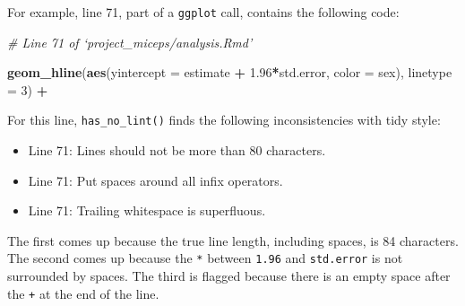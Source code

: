 \documentclass[12pt,twoside]{reedthesis}
\newenvironment{Shaded}{\begin{snugshade}}{\end{snugshade}}
\newcommand{\KeywordTok}[1]{\textcolor[rgb]{0.13,0.29,0.53}{\textbf{#1}}}
\newcommand{\DataTypeTok}[1]{\textcolor[rgb]{0.13,0.29,0.53}{#1}}
\newcommand{\DecValTok}[1]{\textcolor[rgb]{0.00,0.00,0.81}{#1}}
\newcommand{\FloatTok}[1]{\textcolor[rgb]{0.00,0.00,0.81}{#1}}
\newcommand{\StringTok}[1]{\textcolor[rgb]{0.31,0.60,0.02}{#1}}
\newcommand{\CommentTok}[1]{\textcolor[rgb]{0.56,0.35,0.01}{\textit{#1}}}
\newcommand{\OperatorTok}[1]{\textcolor[rgb]{0.81,0.36,0.00}{\textbf{#1}}}
\newcommand{\NormalTok}[1]{#1}
\begin{document}
For example, line 71, part of a \texttt{ggplot} call, contains the
following code:
\begin{Shaded}
\begin{Highlighting}[]
\CommentTok{# Line 71 of `project_miceps/analysis.Rmd'}

\KeywordTok{geom_hline}\NormalTok{(}\KeywordTok{aes}\NormalTok{(}\DataTypeTok{yintercept =}\NormalTok{ estimate }\OperatorTok{+}\StringTok{ }\FloatTok{1.96}\OperatorTok{*}\NormalTok{std.error, }\DataTypeTok{color =}\NormalTok{ sex), }\DataTypeTok{linetype =} \DecValTok{3}\NormalTok{) }\OperatorTok{+}\StringTok{ }
\end{Highlighting}
\end{Shaded}
For this line, \texttt{has\_no\_lint()} finds the following
inconsistencies with tidy style:
\begin{itemize}
\item
  Line 71: Lines should not be more than 80 characters.
\item
  Line 71: Put spaces around all infix operators.
\item
  Line 71: Trailing whitespace is superfluous.
\end{itemize}
The first comes up because the true line length, including spaces, is 84
characters. The second comes up because the \texttt{*} between
\texttt{1.96} and \texttt{std.error} is not surrounded by spaces. The
third is flagged because there is an empty space after the \texttt{+} at
the end of the line.
\end{document}
